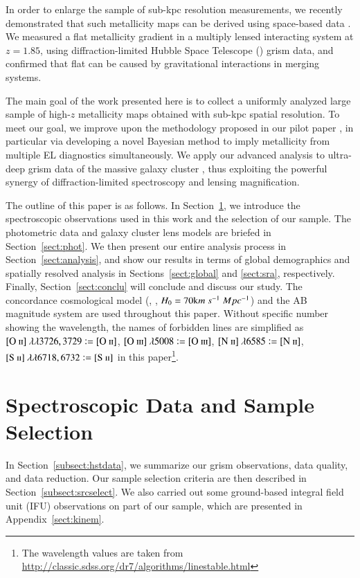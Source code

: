 In order to enlarge the sample of sub-kpc resolution measurements, we recently demonstrated that such metallicity maps can be
derived using space-based data \citep{2015AJ....149..107J}. We measured a flat metallicity gradient in a multiply lensed
interacting system at $z=1.85$, using diffraction-limited Hubble Space Telescope (\hst) grism data, and confirmed that flat \mgs 
can be caused by gravitational interactions in merging systems.

The main goal of the work presented here is to collect a uniformly analyzed large sample of high-$z$ metallicity maps obtained
with sub-kpc spatial resolution. To meet our goal, we improve upon the methodology proposed in our pilot paper
\citep{2015AJ....149..107J}, in particular via developing a novel Bayesian method to imply metallicity from multiple EL
diagnostics simultaneously. We apply our advanced analysis to ultra-deep grism data of the massive galaxy cluster \clyi, thus
exploiting the powerful synergy of \hst diffraction-limited spectroscopy and lensing magnification.

The outline of this paper is as follows. In Section~\ref{sect:spec}, we introduce the spectroscopic observations used in this work
and the selection of our \mg sample. The photometric data and galaxy cluster lens models are briefed in Section~\ref{sect:phot}.
We then present our entire analysis process in Section~\ref{sect:analysis}, and show our results in terms of global demographics
and spatially resolved analysis in Sections~\ref{sect:global} and \ref{sect:sra}, respectively.  Finally,
Section~\ref{sect:conclu} will conclude and discuss our study. The concordance cosmological model (, ,
$H_0=70\mathrm km~s^{-1}~Mpc^{-1}$) and the AB magnitude system \citep{1983ApJ...266..713O} are used throughout this paper.  Without specific number
showing the wavelength, the names of forbidden lines are simplified as $[\textrm{O}~\textsc{ii}]~\lambda\lambda3726,3729\vcentcolon=[\textrm{O}~\textsc{ii}]$,
$[\textrm{O}~\textsc{iii}]~\lambda5008\vcentcolon=[\textrm{O}~\textsc{iii}]$, $[\textrm{N}~\textsc{ii}]~\lambda6585\vcentcolon=[\textrm{N}~\textsc{ii}]$, $[\textrm{S}~\textsc{ii}]~\lambda\lambda6718,6732\vcentcolon=[\textrm{S}~\textsc{ii}]$ in this paper\footnote{The
wavelength values are taken from \url{http://classic.sdss.org/dr7/algorithms/linestable.html}}.


\section{Spectroscopic Data and Sample Selection}\label{sect:spec}

In Section~\ref{subsect:hstdata}, we summarize our \hst grism observations, data quality, and data reduction.
Our sample selection criteria are then described in Section~\ref{subsect:srcselect}.
We also carried out some ground-based integral field unit (IFU) observations on part of our sample, which are presented in 
Appendix~\ref{sect:kinem}.

